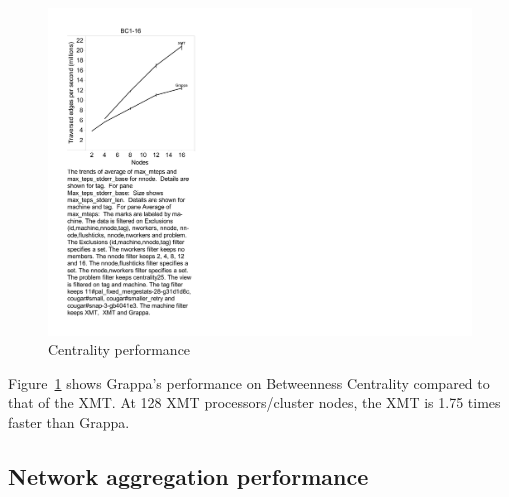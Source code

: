 \begin{figure}[tH]
\begin{center}
  \includegraphics[width=0.95\columnwidth]{figs/centrality_performance}
\begin{minipage}{0.95\columnwidth}
  \caption{\label{fig:centrality-performance} Centrality performance}
\end{minipage}
\vspace{-3ex}
\end{center}
\end{figure}

Figure~\ref{fig:centrality-performance} shows Grappa's performance on
Betweenness Centrality compared to that of the XMT. At 128 XMT
processors/cluster nodes, the XMT is 1.75 times faster than Grappa.

\subsection{Network aggregation performance}


